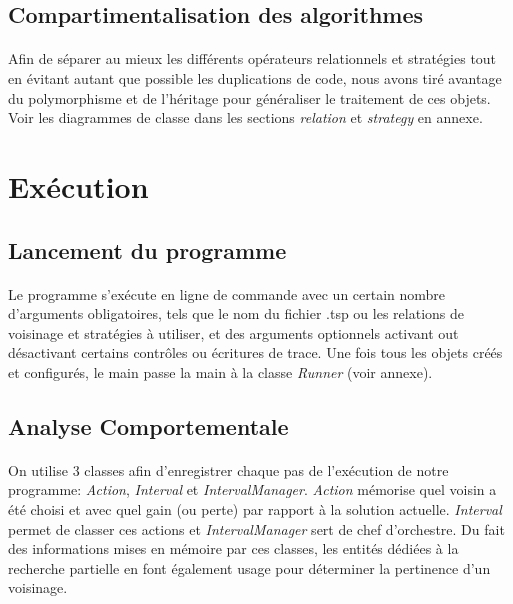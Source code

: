 \documentclass[a4paper,10pt]{report}
\begin{document}
\subsection{Compartimentalisation des algorithmes}
\paragraph{}
  Afin de séparer au mieux les différents opérateurs relationnels et stratégies
tout en évitant autant que possible les duplications de code, nous avons tiré
avantage du polymorphisme et de l'héritage pour généraliser le traitement de ces
objets. Voir les diagrammes de classe dans les sections \textit{relation} et
\textit{strategy} en annexe.


\section{Exécution}
\subsection{Lancement du programme}
\paragraph{}
  Le programme s'exécute en ligne de commande avec un certain nombre d'arguments
obligatoires, tels que le nom du fichier .tsp ou les relations de voisinage et
stratégies à utiliser, et des arguments optionnels activant out désactivant
certains contrôles ou écritures de trace. Une fois tous les objets créés et
configurés, le main passe la main à la classe \textit{Runner} (voir annexe).

\subsection{Analyse Comportementale}
\paragraph{}
  On utilise 3 classes afin d'enregistrer chaque pas de l'exécution de notre
programme: \textit{Action}, \textit{Interval} et \textit{IntervalManager}.
\textit{Action} mémorise quel voisin a été choisi et avec quel gain (ou perte)
par rapport à la solution actuelle. \textit{Interval} permet de classer ces
actions et \textit{IntervalManager} sert de chef d'orchestre. Du fait des
informations mises en mémoire par ces classes, les entités dédiées à la
recherche partielle en font également usage pour déterminer la pertinence d'un
voisinage.
\end{document}
